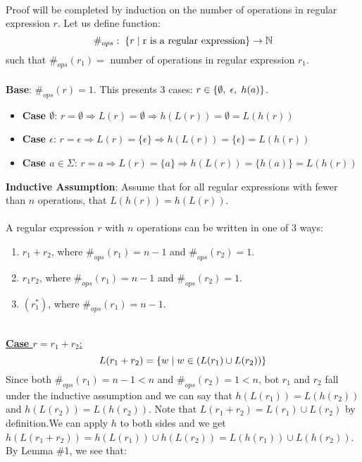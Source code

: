 \documentclass[11pt]{article}
\begin{document}
\\
Proof will be completed by induction on the number of operations in regular expression $r$. Let us define function:
\[\#_{ops}:\hspace{1mm}\{r\hspace{1mm}|\hspace{1mm}\text{r is a regular expression}\}\rightarrow\mathbb{N}\]
such that $\#_{ops}(r_1)=$ number of operations in regular expression $r_1$. \\
\\
\textbf{Base}: $\#_{ops}(r)=1$. This presents 3 cases: $r\in\{\emptyset,\hspace{1mm}\epsilon,\hspace{1mm}h(a)\}$. \\
\begin{itemize}
	\item \textbf{Case $\emptyset$}: $r=\emptyset\Rightarrow L(r)=\emptyset\Rightarrow h(L(r))=\emptyset =L(h(r))$
	\item \textbf{Case $\epsilon$}: $r=\epsilon\Rightarrow L(r)=\{\epsilon\}\Rightarrow h(L(r))=\{\epsilon\}=L(h(r))$
	\item \textbf{Case $a\in\Sigma$}: $r=a\Rightarrow L(r)=\{a\}\Rightarrow h(L(r))=\{h(a)\}=L(h(r))$
\end{itemize}
\textbf{Inductive Assumption}: Assume that for all regular expressions with fewer than $n$ operations, that $L(h(r))=h(L(r))$. \\
\\
A regular expression $r$ with $n$ operations can be written in one of 3 ways: \\
\begin{enumerate}
	\item $r_1+r_2$, where $\#_{ops}(r_1)=n-1$ and $\#_{ops}(r_2)=1$.
	\item $r_1r_2$, where $\#_{ops}(r_1)=n-1$ and $\#_{ops}(r_2)=1$.
	\item $(r_1^*)$, where $\#_{ops}(r_1)=n-1$.
\end{enumerate}
\ \\
\underline{\textbf{Case $r=r_1+r_2$}:}
\[L(r_1+r_2)=\{w\hspace{1mm}|\hspace{1mm}w\in(L(r_1)\cup L(r_2))\}\]
Since both $\#_{ops}(r_1)=n-1<n$ and $\#_{ops}(r_2)=1<n$, bot $r_1$ and $r_2$ fall under the inductive assumption and we can say that $h(L(r_1))=L(h(r_2))$ and $h(L(r_2))=L(h(r_2))$. Note that $L(r_1+r_2)=L(r_1)\cup L(r_2)$ by definition.We can apply $h$ to both sides and we get $h(L(r_1+r_2))=h(L(r_1))\cup h(L(r_2))=L(h(r_1))\cup L(h(r_2))$. By Lemma $\#$1, we see that:
\end{document}

